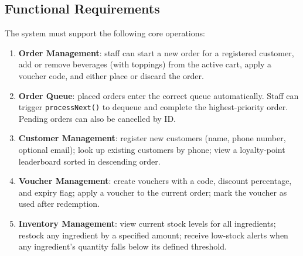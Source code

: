 \documentclass[11pt,a4paper]{article}
\begin{document}
\subsection{Functional Requirements}
The system must support the following core operations:
\begin{enumerate}[leftmargin=*]
    \item \textbf{Order Management}: staff can start a new order for a registered customer, add or remove beverages (with toppings) from the active cart, apply a voucher code, and either place or discard the order.
    \item \textbf{Order Queue}: placed orders enter the correct queue automatically. Staff can trigger \texttt{processNext()} to dequeue and complete the highest-priority order. Pending orders can also be cancelled by ID.
    \item \textbf{Customer Management}: register new customers (name, phone number, optional email); look up existing customers by phone; view a loyalty-point leaderboard sorted in descending order.
    \item \textbf{Voucher Management}: create vouchers with a code, discount percentage, and expiry flag; apply a voucher to the current order; mark the voucher as used after redemption.
    \item \textbf{Inventory Management}: view current stock levels for all ingredients; restock any ingredient by a specified amount; receive low-stock alerts when any ingredient's quantity falls below its defined threshold.
\end{enumerate}
\end{document}
